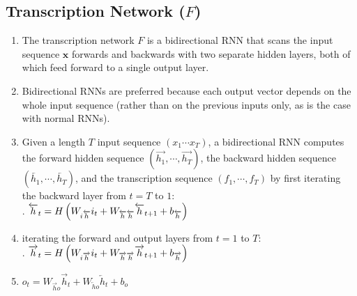 \subsection{Transcription Network ($F$)}


\begin{enumerate}
    \item The transcription network $F$ is a bidirectional RNN that scans the input sequence $\bm{x}$ forwards and backwards with two separate hidden layers, both of which feed forward to a single output layer. 
    \hfill \cite{arxiv/1211.3711/Sequence-Transduction-RNN}

    \item Bidirectional RNNs are preferred because each output vector depends on the whole input sequence (rather than on the previous inputs only, as is the case with normal RNNs).
    \hfill \cite{arxiv/1211.3711/Sequence-Transduction-RNN}

    \item Given a length $T$ input sequence $(x_1 \cdots x_T )$, a bidirectional RNN computes the forward hidden sequence $(\overrightarrow{h_1}, \cdots , \overrightarrow{h_T} )$, the backward hidden sequence $(\overleftarrow{h_1}, \cdots , \overleftarrow{h_T} )$, and the transcription sequence $(f_1, \cdots , f_T )$ by first iterating the backward layer from $t = T$ to $1$:
    \hfill \cite{arxiv/1211.3711/Sequence-Transduction-RNN}
    \\[0.2cm]
    .\hfill
    $\overleftarrow{h}_ t = H\left(W_{i\overleftarrow{h}} i_t + W_{\overleftarrow{h} \overleftarrow{h}} \overleftarrow{h} _{t+1} + b_{\overleftarrow{h}}\right)$
    \hfill \cite{arxiv/1211.3711/Sequence-Transduction-RNN}
    
    
    \item iterating the forward and output layers from $t = 1$ to $T $:
    \hfill \cite{arxiv/1211.3711/Sequence-Transduction-RNN}
    \\[0.2cm]
    .\hfill
    $\overrightarrow{h}_ t = H\left(W_{i\overrightarrow{h}} i_t + W_{\overrightarrow{h} \overrightarrow{h}} \overrightarrow{h} _{t+1} + b_{\overrightarrow{h}}\right)$
    \hfill \cite{arxiv/1211.3711/Sequence-Transduction-RNN}

    \item $o_t = W_{\overrightarrow{h} o} \overrightarrow{h}_ t + W_{\overleftarrow{h} o}\overleftarrow{h}_ t + b_o $
\end{enumerate}







